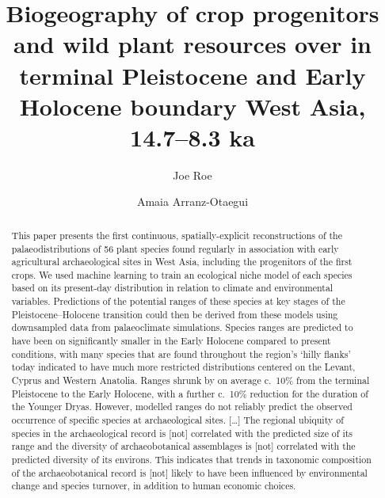 \documentclass[
  authoryear,
  review]{elsarticle}
\begin{document}
\begin{frontmatter}
\title{Biogeography of crop progenitors and wild plant resources over in
terminal Pleistocene and Early Holocene boundary West Asia, 14.7--8.3
ka}
\author[1,2]{Joe Roe%
%
}
\author[3]{Amaia Arranz-Otaegui%
%
}





        
\begin{abstract}
This paper presents the first continuous, spatially-explicit
reconstructions of the palaeodistributions of 56 plant species found
regularly in association with early agricultural archaeological sites in
West Asia, including the progenitors of the first crops. We used machine
learning to train an ecological niche model of each species based on its
present-day distribution in relation to climate and environmental
variables. Predictions of the potential ranges of these species at key
stages of the Pleistocene--Holocene transition could then be derived
from these models using downsampled data from palaeoclimate simulations.
Species ranges are predicted to have been on significantly smaller in
the Early Holocene compared to present conditions, with many species
that are found throughout the region's `hilly flanks' today indicated to
have much more restricted distributions centered on the Levant, Cyprus
and Western Anatolia. Ranges shrunk by on average c.~10\% from the
terminal Pleistocene to the Early Holocene, with a further c.~10\%
reduction for the duration of the Younger Dryas. However, modelled
ranges do not reliably predict the observed occurrence of specific
species at archaeological sites. {[}\ldots{]} The regional ubiquity of
species in the archaeological record is {[}not{]} correlated with the
predicted size of its range and the diversity of archaeobotanical
assemblages is {[}not{]} correlated with the predicted diversity of its
environs. This indicates that trends in taxonomic composition of the
archaeobotanical record is {[}not{]} likely to have been influenced by
environmental change and species turnover, in addition to human economic
choices.
\end{abstract}





\end{frontmatter}
    
\end{document}
